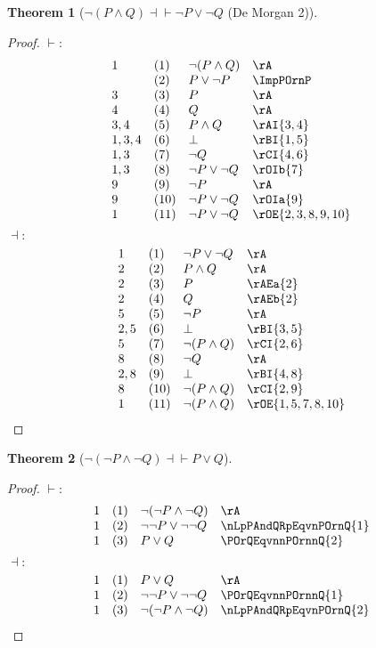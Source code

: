 \documentclass{book}
\theoremstyle{plain}
\newtheorem{theorem}{Theorem}
\theoremstyle{remark}
\theoremstyle{definition}
\begin{document}
\label{nLpPAndQRpEqvnPOrnQ}
\begin{theorem}[\(\neg(P \land Q) \dashv \vdash \neg P \lor \neg Q\) (De Morgan 2)]
\end{theorem}
\begin{proof}
	\(\vdash:\)
	\[
	\begin{array}{llll}
		1 & (1) & \neg(P \land Q) & \rA \\
		& (2) & P \lor \neg P & \ImpPOrnP \\
		3 & (3) & P & \rA \\
		4 & (4) & Q & \rA \\
		3,4 & (5) & P \land Q & \rAI{3,4} \\
		1,3,4 & (6) & \bot & \rBI{1,5} \\
		1,3 & (7) & \neg Q & \rCI{4,6} \\
		1,3 & (8) & \neg P \lor \neg Q & \rOIb{7} \\
		9 & (9) & \neg P & \rA \\
		9 & (10) & \neg P \lor \neg Q & \rOIa{9} \\
		1 & (11) & \neg P \lor \neg Q & \rOE{2,3,8,9,10} 
	\end{array}
	\]
	\(\dashv:\)
	\[
	\begin{array}{llll}
		1 & (1) & \neg P \lor \neg Q & \rA \\
		2 & (2) & P \land Q & \rA \\
		2 & (3) & P & \rAEa{2} \\
		2 & (4) & Q & \rAEb{2} \\
		5 & (5) & \neg P & \rA \\
		2,5 & (6) & \bot & \rBI{3,5} \\
		5 & (7) & \neg (P \land Q) & \rCI{2,6} \\
		8 & (8) & \neg Q & \rA \\
		2,8 & (9) & \bot & \rBI{4,8} \\
		8 & (10) & \neg (P \land Q) & \rCI{2,9} \\
		1 & (11) & \neg (P \land Q) & \rOE{1,5,7,8,10} 
	\end{array}
	\]
\end{proof}

\label{nLpnPAndnQRpEqvPOrQ}
\begin{theorem}[\(\neg(\neg P \land \neg Q) \dashv \vdash P \lor Q\)]
\end{theorem}
\begin{proof}
	\(\vdash:\)
	\[
	\begin{array}{llll}
		1 & (1) & \neg(\neg P \land \neg Q) & \rA \\
		1 & (2) & \neg\neg P \lor \neg\neg Q & \nLpPAndQRpEqvnPOrnQ{1} \\
		1 & (3) & P\lor Q & \POrQEqvnnPOrnnQ{2} \\
	\end{array}
	\]
	\(\dashv:\)
	\[
	\begin{array}{llll}
		1 & (1) & P \lor Q & \rA \\
		1 & (2) & \neg\neg P \lor \neg\neg Q & \POrQEqvnnPOrnnQ{1} \\
        1 & (3) & \neg(\neg P \land \neg Q) & \nLpPAndQRpEqvnPOrnQ{2} \\
	\end{array}
	\]
\end{proof}
\end{document}
